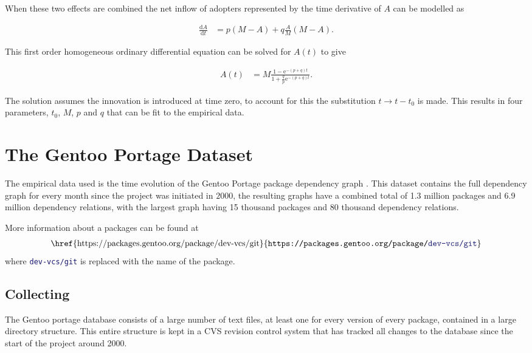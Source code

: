 \documentclass[smallextended,final]{svjour3}
\newcommand{\nd}[2]{\frac{\mathrm{d} #1}{\mathrm{d} #2}}
\newcommand{\e}{\mathrm{e}}
\begin{document}
When these two effects are combined the net inflow of adopters represented by the time derivative of $A$ can be modelled as

\begin{align}
	\nd{A}{t} &= p (M-A) + q\frac{A}{M}(M-A) \text{.}
\end{align}

This first order homogeneous ordinary differential equation can be solved for $A(t)$ to give

\begin{align} \label{eq:bass}
	A(t) &= M \frac{1 - \e^{-(p+q)t}}{1 + \frac{q}{p} \e^{-(p+q)t}} \text{.}
\end{align}

The solution assumes the innovation is introduced at time zero, to account for this the substitution $t \rightarrow t - t_0$ is made. This results in four parameters, $t_0$, $M$, $p$ and $q$ that can be fit to the empirical data.


\section{The Gentoo Portage Dataset}

The empirical data used is the time evolution of the Gentoo Portage package dependency graph \citep{bloemen14b}. This dataset contains the full dependency graph for every month since the project was initiated in $2000$, the resulting graphs have a combined total of 1.3 million packages and 6.9 million dependency relations, with the largest graph having 15 thousand packages and 80 thousand dependency relations.

More information about a packages can be found at
\begin{align}
\mbox{
\href{https://packages.gentoo.org/package/dev-vcs/git}{\texttt{https://packages.gentoo.org/package/\textcolor{MidnightBlue}{dev-vcs/git}}}
}\label{url:pkg}
\end{align}
where \texttt{\textcolor{MidnightBlue}{dev-vcs/git}} is replaced with the name of the package.

\subsection{Collecting}

The Gentoo portage database consists of a large number of text files, at least one for every version of every package, contained in a large directory structure. This entire structure is kept in a CVS revision control system that has tracked all changes to the database since the start of the project around 2000.
\end{document}
